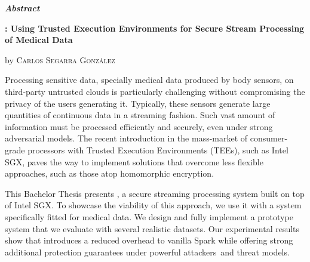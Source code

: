 \vspace*{2.00cm}
\begin{center}
%
%
%
%
%
%    

    \LARGE
    \textit{\textbf{Abstract}} \label{sec:abstract}

    \vspace{0.5cm}

    \large
    \textbf{\projName: Using Trusted Execution Environments for Secure Stream Processing of Medical Data}

    by \textsc{Carlos Segarra Gonz\'alez}
\end{center}

\vspace{0.5cm}

\normalsize
Processing sensitive data, specially medical data produced by body sensors, on third-party untrusted clouds is particularly challenging without compromising the privacy of the users generating it. Typically, these sensors generate large quantities of continuous data in a streaming fashion. Such vast amount of information must be processed efficiently and securely, even under strong adversarial models. The recent introduction in the mass-market of consumer-grade processors with Trusted Execution Environments (TEEs), such as Intel SGX, paves the way to implement solutions that overcome less flexible approaches, such as those atop homomorphic encryption. 
    
This Bachelor Thesis presents \projName, a secure streaming processing system built on top of Intel SGX. To showcase the viability of this approach, we use it with a system specifically fitted for medical data. We design and fully implement a prototype system that we evaluate with several realistic datasets. Our experimental results show that \projName introduces a reduced overhead to vanilla Spark while offering strong additional protection guarantees under powerful attackers and threat models.


